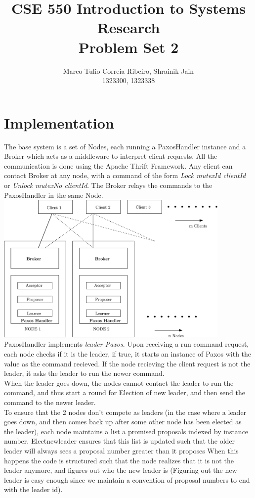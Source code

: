 \documentclass[letterpaper]{article}
\title{CSE 550 Introduction to Systems Research \\ Problem Set 2}
\begin{document}
\author{Marco Tulio Correia Ribeiro, Shrainik Jain\\ 1323300, 1323338}
\maketitle

\section{Implementation}
The base system is a set of Nodes, each running a PaxosHandler instance and a Broker which acts as a middleware to interpret client requests. All the communication is done using the Apache Thrift Framework. Any client can contact Broker at any node, with a command of the form {\em Lock mutexId clientId} or {\em Unlock mutexNo clientId}. The Broker relays the commands to the PaxosHandler in the same Node. \\

\includegraphics[width = 4.5in, keepaspectratio]{Architecture.eps}\\

PaxosHandler implements {\em leader Paxos}. Upon receiving a run command request, each node checks if it is the leader, if true, it starts an instance of Paxos with the value as the command recieved. If the node recieving the client request is not the leader, it asks the leader to run the newer command.\\
When the leader goes down, the nodes cannot contact the leader to run the command, and thus start a round for Election of new leader, and then send the command to the newer leader.\\
To ensure that the 2 nodes don't compete as leaders (in the case where a leader goes down, and then comes back up after some other node has been elected as the leader), each node maintains a list a promised proposals indexed by instance number. Electnewleader ensures that this list is updated such that the older leader will always sees a proposal number greater than it proposes When this happens the code is structured such that the node realizes that it is not the leader anymore, and figures out who the new leader is (Figuring out the new leader is easy enough since we maintain a convention of proposal numbers to end with the leader id).
\end{document}
